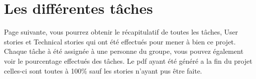 \chapter{Les différentes tâches}\label{tableauTaches}
Page suivante, vous pourrez obtenir le récapitulatif de toutes les tâches, User stories et Technical stories qui ont été effectués pour mener à bien ce projet.
Chaque tâche à été assignée à une personne du groupe, vous pouvez également voir le pourcentage effectués des tâches. Le pdf ayant été généré a la fin du projet
celles-ci sont toutes à 100\% sauf les stories n'ayant pus être faite.

